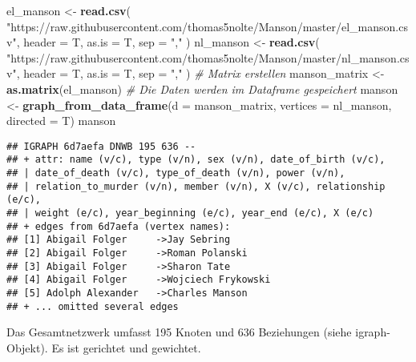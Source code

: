 \documentclass[
]{article}
\newenvironment{Shaded}{\begin{snugshade}}{\end{snugshade}}
\newcommand{\CommentTok}[1]{\textcolor[rgb]{0.56,0.35,0.01}{\textit{#1}}}
\newcommand{\DataTypeTok}[1]{\textcolor[rgb]{0.13,0.29,0.53}{#1}}
\newcommand{\KeywordTok}[1]{\textcolor[rgb]{0.13,0.29,0.53}{\textbf{#1}}}
\newcommand{\NormalTok}[1]{#1}
\newcommand{\StringTok}[1]{\textcolor[rgb]{0.31,0.60,0.02}{#1}}
\begin{document}
\begin{Shaded}
\begin{Highlighting}[]
\NormalTok{el_manson <-}
\StringTok{  }\KeywordTok{read.csv}\NormalTok{(}
    \StringTok{"https://raw.githubusercontent.com/thomas5nolte/Manson/master/el_manson.csv"}\NormalTok{,}
    \DataTypeTok{header =}\NormalTok{ T,}
    \DataTypeTok{as.is =}\NormalTok{ T,}
    \DataTypeTok{sep =} \StringTok{","}
\NormalTok{  )}
\NormalTok{nl_manson <-}
\StringTok{  }\KeywordTok{read.csv}\NormalTok{(}
    \StringTok{"https://raw.githubusercontent.com/thomas5nolte/Manson/master/nl_manson.csv"}\NormalTok{,}
    \DataTypeTok{header =}\NormalTok{ T,}
    \DataTypeTok{as.is =}\NormalTok{ T,}
    \DataTypeTok{sep =} \StringTok{","}
\NormalTok{  )}
\CommentTok{# Matrix erstellen}
\NormalTok{manson_matrix <-}\StringTok{ }\KeywordTok{as.matrix}\NormalTok{(el_manson)}
\CommentTok{# Die Daten werden im Dataframe gespeichert}
\NormalTok{manson <-}
\StringTok{  }\KeywordTok{graph_from_data_frame}\NormalTok{(}\DataTypeTok{d =}\NormalTok{ manson_matrix,}
                        \DataTypeTok{vertices =}\NormalTok{ nl_manson,}
                        \DataTypeTok{directed =}\NormalTok{ T)}
\NormalTok{manson}
\end{Highlighting}
\end{Shaded}

\begin{verbatim}
## IGRAPH 6d7aefa DNWB 195 636 -- 
## + attr: name (v/c), type (v/n), sex (v/n), date_of_birth (v/c),
## | date_of_death (v/c), type_of_death (v/n), power (v/n),
## | relation_to_murder (v/n), member (v/n), X (v/c), relationship (e/c),
## | weight (e/c), year_beginning (e/c), year_end (e/c), X (e/c)
## + edges from 6d7aefa (vertex names):
## [1] Abigail Folger     ->Jay Sebring       
## [2] Abigail Folger     ->Roman Polanski    
## [3] Abigail Folger     ->Sharon Tate       
## [4] Abigail Folger     ->Wojciech Frykowski
## [5] Adolph Alexander   ->Charles Manson    
## + ... omitted several edges
\end{verbatim}

Das Gesamtnetzwerk umfasst 195 Knoten und 636 Beziehungen (siehe
igraph-Objekt). Es ist gerichtet und gewichtet.
\end{document}
